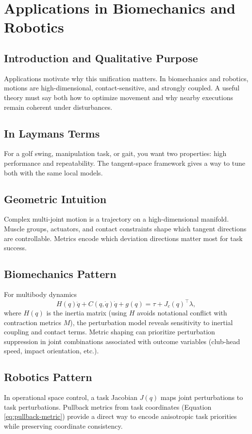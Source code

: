\documentclass[11pt,letterpaper]{article}
\begin{document}
\section{Applications in Biomechanics and Robotics}

\subsection{Introduction and Qualitative Purpose}
Applications motivate why this unification matters. In biomechanics and robotics, motions are high-dimensional, contact-sensitive, and strongly coupled. A useful theory must say both how to optimize movement and why nearby executions remain coherent under disturbances.

\subsection{In Laymans Terms}
For a golf swing, manipulation task, or gait, you want two properties: high performance and repeatability. The tangent-space framework gives a way to tune both with the same local models.

\subsection{Geometric Intuition}
Complex multi-joint motion is a trajectory on a high-dimensional manifold. Muscle groups, actuators, and contact constraints shape which tangent directions are controllable. Metrics encode which deviation directions matter most for task success.

\subsection{Biomechanics Pattern}
For multibody dynamics
\begin{equation}
H(q)\ddot q + C(q,\dot q)\dot q + g(q) = \tau + J_c(q)^\top\lambda,
\label{eq:multibody}
\end{equation}
where $H(q)$ is the inertia matrix (using $H$ avoids notational conflict with contraction metrics $M$), the perturbation model reveals sensitivity to inertial coupling and contact terms. Metric shaping can prioritize perturbation suppression in joint combinations associated with outcome variables (club-head speed, impact orientation, etc.).

\subsection{Robotics Pattern}
In operational space control, a task Jacobian $J(q)$ maps joint perturbations to task perturbations. Pullback metrics from task coordinates (Equation \eqref{eq:pullback-metric}) provide a direct way to encode anisotropic task priorities while preserving coordinate consistency.
\end{document}
